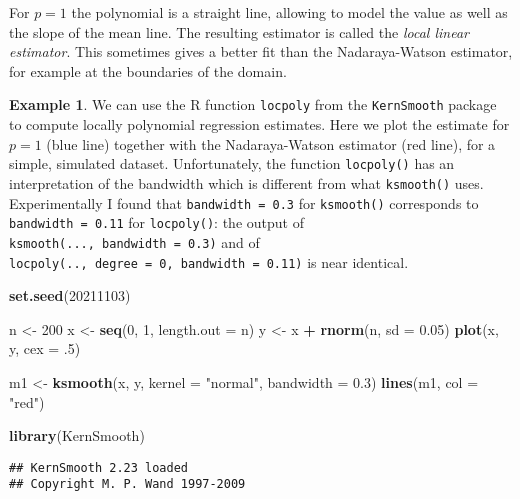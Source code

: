 \documentclass[
  a4paper,
]{article}
\newenvironment{Shaded}{\begin{snugshade}}{\end{snugshade}}
\newcommand{\AttributeTok}[1]{\textcolor[rgb]{0.13,0.29,0.53}{#1}}
\newcommand{\DecValTok}[1]{\textcolor[rgb]{0.00,0.00,0.81}{#1}}
\newcommand{\FloatTok}[1]{\textcolor[rgb]{0.00,0.00,0.81}{#1}}
\newcommand{\FunctionTok}[1]{\textcolor[rgb]{0.13,0.29,0.53}{\textbf{#1}}}
\newcommand{\NormalTok}[1]{#1}
\newcommand{\OtherTok}[1]{\textcolor[rgb]{0.56,0.35,0.01}{#1}}
\newcommand{\SpecialCharTok}[1]{\textcolor[rgb]{0.81,0.36,0.00}{\textbf{#1}}}
\newcommand{\StringTok}[1]{\textcolor[rgb]{0.31,0.60,0.02}{#1}}
\theoremstyle{definition}
\theoremstyle{definition}
\newtheorem{example}{Example}[section]
\theoremstyle{definition}
\theoremstyle{definition}
\theoremstyle{remark}
\begin{document}
For \(p=1\) the polynomial is a straight line, allowing to model the
value as well as the slope of the mean line. The resulting estimator
is called the \emph{local linear estimator}.
This sometimes gives
a better fit than the Nadaraya-Watson estimator, for example at the boundaries
of the domain.

\begin{example}
We can use the R function \texttt{locpoly} from the \texttt{KernSmooth} package to
compute locally polynomial regression estimates. Here we plot
the estimate for \(p=1\) (blue line) together with the Nadaraya-Watson
estimator (red line), for a simple, simulated dataset.
Unfortunately, the function \texttt{locpoly()} has an interpretation of the bandwidth
which is different from what \texttt{ksmooth()} uses. Experimentally I found
that \texttt{bandwidth\ =\ 0.3} for \texttt{ksmooth()} corresponds to
\texttt{bandwidth\ =\ 0.11} for \texttt{locpoly()}: the output of
\texttt{ksmooth(...,\ bandwidth\ =\ 0.3)}
and of \texttt{locpoly(..,\ degree\ =\ 0,\ bandwidth\ =\ 0.11)} is near identical.

\begin{Shaded}
\begin{Highlighting}[]
\FunctionTok{set.seed}\NormalTok{(}\DecValTok{20211103}\NormalTok{)}

\NormalTok{n }\OtherTok{\textless{}{-}} \DecValTok{200}
\NormalTok{x }\OtherTok{\textless{}{-}} \FunctionTok{seq}\NormalTok{(}\DecValTok{0}\NormalTok{, }\DecValTok{1}\NormalTok{, }\AttributeTok{length.out =}\NormalTok{ n)}
\NormalTok{y }\OtherTok{\textless{}{-}}\NormalTok{ x }\SpecialCharTok{+} \FunctionTok{rnorm}\NormalTok{(n, }\AttributeTok{sd =} \FloatTok{0.05}\NormalTok{)}
\FunctionTok{plot}\NormalTok{(x, y, }\AttributeTok{cex =}\NormalTok{ .}\DecValTok{5}\NormalTok{)}

\NormalTok{m1 }\OtherTok{\textless{}{-}} \FunctionTok{ksmooth}\NormalTok{(x, y, }\AttributeTok{kernel =} \StringTok{"normal"}\NormalTok{, }\AttributeTok{bandwidth =} \FloatTok{0.3}\NormalTok{)}
\FunctionTok{lines}\NormalTok{(m1, }\AttributeTok{col =} \StringTok{"red"}\NormalTok{)}

\FunctionTok{library}\NormalTok{(KernSmooth)}
\end{Highlighting}
\end{Shaded}

\begin{verbatim}
## KernSmooth 2.23 loaded
## Copyright M. P. Wand 1997-2009
\end{verbatim}


\end{example}
\end{document}
